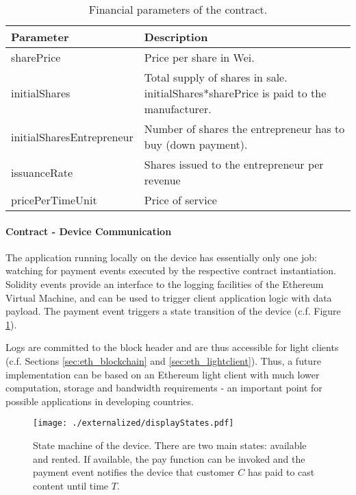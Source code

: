  \begin{table}
  \centering
  \begin{tabularx}{\textwidth}{ l  X  }
    \toprule
    Parameter & Description \\
    \midrule
    sharePrice & Price per share in Wei. \\ 
    initialShares & Total supply of shares in sale. initialShares*sharePrice is paid to the manufacturer.\\
    initialSharesEntrepreneur & Number of shares the entrepreneur has to buy (down payment). \\
    issuanceRate & Shares issued to the entrepreneur per revenue \\  
    pricePerTimeUnit & Price of service \\  
    \bottomrule
  \end{tabularx}
  \caption{Financial parameters of the contract.}
  \label{tbl:parameters}
\end{table}


\paragraph{Contract - Device Communication}

The application running locally on the device has essentially only one job: watching for payment events executed by the respective contract instantiation. Solidity events provide an interface to the logging facilities of the Ethereum Virtual Machine, and can be used to trigger client application logic with data payload. The payment event triggers a state transition of the device (c.f. Figure \ref{fig:displayStates}).

Logs are committed to the block header and are thus accessible for light clients (c.f. Sections \ref{sec:eth_blockchain} and \ref{sec:eth_lightclient}). Thus, a future implementation can be based on an Ethereum light client with much lower computation, storage and bandwidth requirements - an important point for possible applications in developing countries.

\begin{figure}
 \centering
 \texttt{[image: ./externalized/displayStates.pdf]}
 \caption{State machine of the device. There are two main states: available and rented. If available, the pay function can be invoked and the payment event notifies the device that customer $C$ has paid to cast content until time $T$.}
 \label{fig:displayStates}
 \end{figure}



